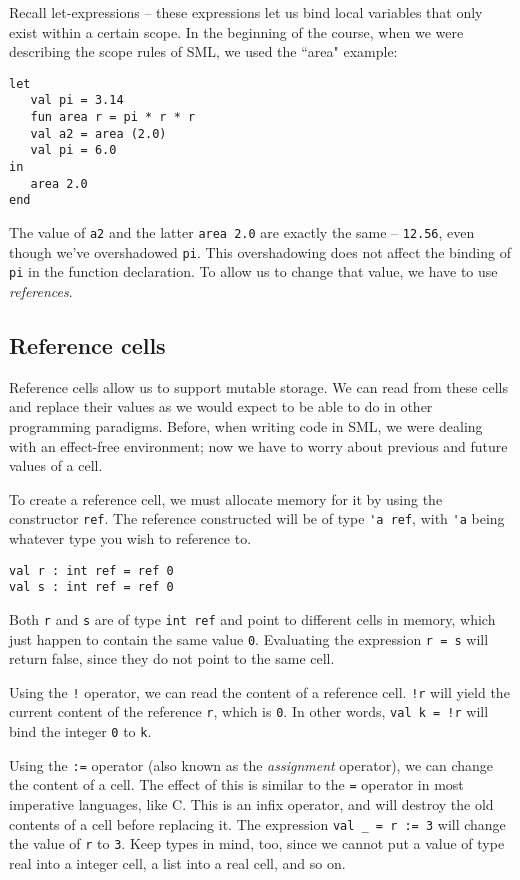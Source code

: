 \documentclass[11pt]{article}
\begin{document}
Recall let-expressions -- these expressions let us bind local variables that only exist within a certain scope. In the beginning of the course, when we were describing the scope rules of SML, we used the ``area" example:

\begin{verbatim}
let
   val pi = 3.14
   fun area r = pi * r * r
   val a2 = area (2.0)
   val pi = 6.0
in
   area 2.0
end
\end{verbatim}

The value of \verb~a2~ and the latter \verb~area 2.0~ are exactly the same -- \verb~12.56~, even though we've overshadowed \verb~pi~. This overshadowing does not affect the binding of \verb~pi~ in the function declaration. To allow us to change that value, we have to use \emph{references}.

\subsection{Reference cells}

Reference cells allow us to support mutable storage. We can read from these cells and replace their values as we would expect to be able to do in other programming paradigms. Before, when writing code in SML, we were dealing with an effect-free environment; now we have to worry about previous and future values of a cell. 

To create a reference cell, we must allocate memory for it by using the constructor \verb~ref~. The reference constructed will be of type \verb~'a ref~, with \verb~'a~ being whatever type you wish to reference to.

\begin{verbatim}
val r : int ref = ref 0
val s : int ref = ref 0
\end{verbatim}

Both \verb~r~ and \verb~s~ are of type \verb~int ref~ and point to different cells in memory, which just happen to contain the same value \verb~0~. Evaluating the expression \verb~r = s~ will return false, since they do not point to the same cell.

Using the \verb~!~ operator, we can read the content of a reference cell. \verb~!r~ will yield the current content of the reference \verb~r~, which is \verb~0~. In other words, \verb~val k = !r~ will bind the integer \verb~0~ to \verb~k~.

Using the \verb~:=~ operator (also known as the \emph{assignment} operator), we can change the content of a cell. The effect of this is similar to the \verb~=~ operator in most imperative languages, like C. This is an infix operator, and will destroy the old contents of a cell before replacing it. The expression \verb~val _ = r := 3~ will change the value of \verb~r~ to \verb~3~. Keep types in mind, too, since we cannot put a value of type real into a integer cell, a list into a real cell, and so on.
\end{document}
